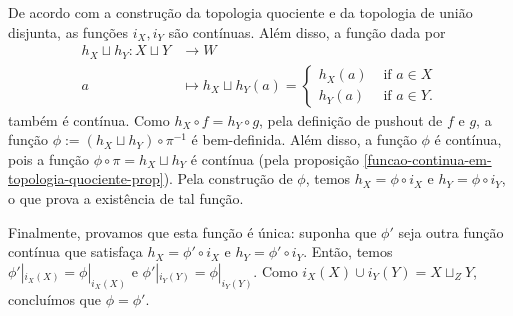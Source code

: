 \begin{dem}
    De acordo com a construção da topologia quociente e da topologia de união disjunta, as funções $i_X,i_Y$ são contínuas. Além disso, a função dada por 
    \begin{align*}
        h_X\sqcup h_Y:X\sqcup Y&\longrightarrow W\\
        a&\longmapsto h_X\sqcup h_Y(a)=\begin{cases}
         h_X(a) & \text{ if }a\in X\\
         h_Y(a) & \text{ if }a\in Y.
        \end{cases}
    \end{align*}
    também é contínua. Como $h_X\circ f=h_Y\circ g$, pela definição de pushout de $f$ e $g$, a função $\phi:=(h_X\sqcup h_Y)\circ \pi^{-1}$ é bem-definida. Além disso, a função $\phi$ é contínua, pois a função $\phi\circ\pi=h_X\sqcup h_Y$ é contínua (pela proposição \ref{funcao-continua-em-topologia-quociente-prop}). Pela construção de $\phi$, temos $h_X=\phi\circ i_X$ e $h_Y=\phi\circ i_Y$, o que prova a existência de tal função.

    Finalmente, provamos que esta função é única: suponha que $\phi'$ seja outra função contínua que satisfaça $h_X=\phi'\circ i_X$ e $h_Y=\phi'\circ i_Y$. Então, temos $\phi'|_{i_X(X)}=\phi|_{i_X(X)}$ e $\phi'|_{i_Y(Y)}=\phi|_{i_Y(Y)}$. Como $i_X(X)\cup i_Y(Y)=X\sqcup_ZY$, concluímos que $\phi=\phi'$.
\end{dem}

